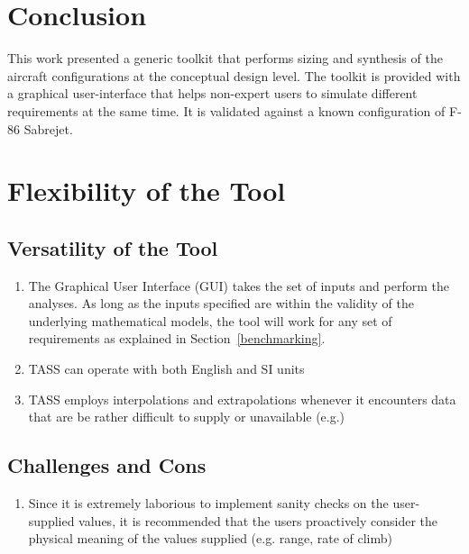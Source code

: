 \documentclass[pdftex,12pt,letter]{article}
\begin{document}
\section{Conclusion}\label{conclusion}

This work presented a generic toolkit that performs sizing and synthesis of the aircraft configurations at the conceptual design level. The toolkit is provided with a graphical user-interface that helps non-expert users to simulate different requirements at the same time. It is validated against a known configuration of F-86 Sabrejet. 


	

\appendix

\section{Flexibility of the Tool}
\label{appendix:flexibility}

\subsection{Versatility of the Tool}

\begin{enumerate}

\item The Graphical User Interface (GUI) takes the set of inputs and perform the analyses. As long as the inputs specified are within the validity of the underlying mathematical models, the tool will work for any set of requirements as explained in Section~\ref{benchmarking}.

\item TASS can operate with both English and SI units

\item TASS employs interpolations and extrapolations whenever it encounters data that are be rather difficult to supply or unavailable (e.g.) 

\end{enumerate}

\subsection{Challenges and Cons}

\begin{enumerate}

\item  Since it is extremely laborious to implement sanity checks on the user-supplied values, it is recommended that the users proactively consider the physical meaning of the values supplied (e.g. range, rate of climb)

\end{enumerate}
\end{document}
